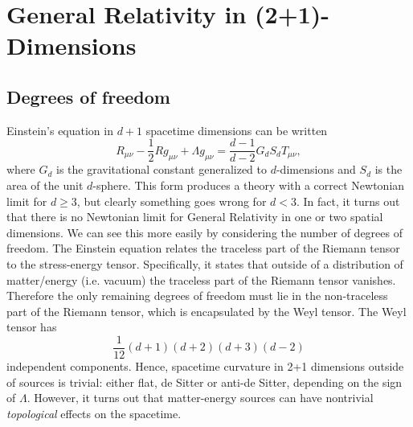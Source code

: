 \documentclass[12pt]{article}
\begin{document}
\section{General Relativity in (2+1)-Dimensions}
\subsection{Degrees of freedom}
Einstein's equation in $d+1$ spacetime dimensions can be written \cite{cornish}
\begin{equation}
    R_{\mu\nu} - \frac{1}{2}Rg_{\mu\nu} + \Lambda g_{\mu\nu} = \frac{d-1}{d-2}G_dS_dT_{\mu\nu},
\end{equation}
where $G_d$ is the gravitational constant generalized to $d$-dimensions and $S_d$ is the area of the unit $d$-sphere. This form produces a theory with a correct Newtonian limit for $d\geq3$, but clearly something goes wrong for $d<3$. In fact, it turns out that there is no Newtonian limit for General Relativity in one or two spatial dimensions. We can see this more easily by considering the number of degrees of freedom. The Einstein equation relates the traceless part of the Riemann tensor to the stress-energy tensor. Specifically, it states that outside of a distribution of matter/energy (i.e. vacuum) the traceless part of the Riemann tensor vanishes. Therefore the only remaining degrees of freedom must lie in the non-traceless part of the Riemann tensor, which is encapsulated by the Weyl tensor. The Weyl tensor has \[ \frac{1}{12}(d+1)(d+2)(d+3)(d-2) \] independent components. Hence, spacetime curvature in 2+1 dimensions outside of sources is trivial: either flat, de Sitter or anti-de Sitter, depending on the sign of $\Lambda$. However, it turns out that matter-energy sources can have nontrivial \textit{topological} effects on the spacetime.
\end{document}

